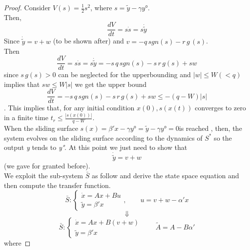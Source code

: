 \begin{proof}
	Consider $V(s)=\frac{1}{2}s^2$, where $s=\tilde{y}-\gamma y°$.\\ Then, \[\frac{dV}{dt}=s\dot{s}=s\dot{\tilde{y}}\] Since $\dot{\tilde{y}}=v+w$ (to be shown after) and $v=-q\, sgn(s)-r\,g\,(s)$.\\ Then \[\frac{dV}{dt}=s\dot{s}=s\dot{\tilde{y}}=-s\,q\,sgn(s)-s\,r\,g(s)+sw\]
	since $s\,g(s)>0$ can be neglected for the upperbounding and $|w|\le W(<q)$ implies that $sw \le W|s|$ we get the upper bound \[\frac{dV}{dt}=-s\,q\,sgn(s)-s\,r\,g(s)+sw\le -(q-W)|s|\]. This implies that, for any initial condition $x(0),s(x(t))$ converges to zero in a finite time $t_r\le \frac{|s(x(0))|}{q-W}$.\\When the sliding surface  $s(x)=\beta'x-\gamma y°=\tilde{y}-\gamma y°=0$is reached , then, the system evolves on the sliding surface according to the dynamics of $S^*$ so the output \emph{y} tends to \emph{y°}. At this point we just need to show that \[\dot{\tilde{y}}=v+w\] (we gave for granted before).\\
We exploit the sub-system $\bar{S}$ as follow and derive the state space equation and then compute the transfer function.
\[\bar{S}:\begin{cases}
	\dot{x}=Ax+Bu\\
	\tilde{y}=\beta'x
\end{cases},\qquad u=v+w-\alpha'x
\] \[\Downarrow\]
\[\bar{S}:\begin{cases}
	\dot{x}=Ax+B(v+w)\\
	\tilde{y}=\beta'x
\end{cases}\qquad \tilde{A}=A-B\alpha'
\] where


\end{proof}
